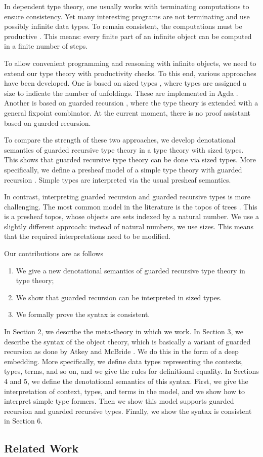 In dependent type theory, one usually works with terminating computations to ensure consistency.
Yet many interesting programs are not terminating and use possibly infinite data types.
To remain consistent, the computations must be productive \cite{Coquand93}.
This means: every finite part of an infinite object can be computed in a finite number of steps.

To allow convenient programming and reasoning with infinite objects, we need to extend our type theory with productivity checks.
To this end, various approaches have been developed.
One is based on sized types \cite{A-sized,AVW-normalization}, where types are assigned a size to indicate the number of unfoldings.
These are implemented in Agda \cite{norell2008}.
Another is based on guarded recursion \cite{atkey2013productive,BahrGM17}, where the type theory is extended with a general fixpoint combinator.
At the current moment, there is no proof assistant based on guarded recursion.

To compare the strength of these two approaches, we develop denotational semantics of guarded recursive type theory in a type theory with sized types.
This shows that guarded recursive type theory can be done via sized types.
More specifically, we define a presheaf model of a simple type theory with guarded recursion \cite{BMSS-synthetic}.
Simple types are interpreted via the usual presheaf semantics.

In contrast, interpreting guarded recursion and guarded recursive types is more challenging.
The most common model in the literature is the topos of trees \cite{BMSS-synthetic}.
This is a presheaf topos, whose objects are sets indexed by a natural number.
We use a slightly different approach: instead of natural numbers, we use sizes.
This means that the required interpretations need to be modified.

Our contributions are as follows
\begin{enumerate}
	\item We give a new denotational semantics of guarded recursive type theory in type theory;
	\item We show that guarded recursion can be interpreted in sized types.
	\item We formally prove the syntax is consistent.
\end{enumerate}

In Section 2, we describe the meta-theory in which we work.
In Section 3, we describe the syntax of the object theory, which is basically a variant of guarded recursion as done by Atkey and McBride \cite{atkey2013productive}.
We do this in the form of a deep embedding.
More specifically, we define data types representing the contexts, types, terms, and so on, and we give the rules for definitional equality.
In Sections 4 and 5, we define the denotational semantics of this syntax.
First, we give the interpretation of context, types, and terms in the model, and we show how to interpret simple type formers.
Then we show this model supports guarded recursion and guarded recursive types.
Finally, we show the syntax is consistent in Section 6.

\subsection*{Related Work}